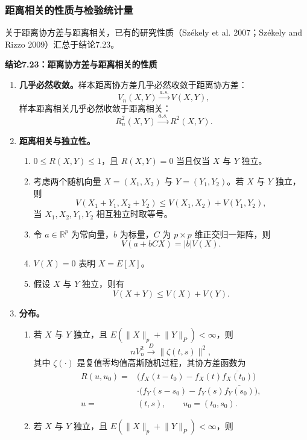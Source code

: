 \subsubsection{距离相关的性质与检验统计量}
关于距离协方差与距离相关，已有的研究性质（Székely et al. 2007；Székely and Rizzo 2009）汇总于结论7.23。

\par\medskip{}\noindent\textbf{结论7.23：距离协方差与距离相关的性质}\par
\begin{enumerate}
\item \textbf{几乎必然收敛。}样本距离协方差几乎必然收敛于距离协方差：
\[
V_n(X,Y)\xrightarrow{a.s.}V(X,Y),
\]
样本距离相关几乎必然收敛于距离相关：
\[
R_n^2(X,Y)\xrightarrow{a.s.}R^2(X,Y).
\]
\item \textbf{距离相关与独立性。}
\begin{enumerate}[label=\alph*.]
\item $0\le R(X,Y)\le1$，且 $R(X,Y)=0$ 当且仅当 $X$ 与 $Y$ 独立。
\item 考虑两个随机向量 $X=(X_1,X_2)$ 与 $Y=(Y_1,Y_2)$。若 $X$ 与 $Y$ 独立，则
\[
V(X_1+Y_1,X_2+Y_2)\le V(X_1,X_2)+V(Y_1,Y_2),
\]
当 $X_1,X_2,Y_1,Y_2$ 相互独立时取等号。
\item 令 $a\in\mathbb R^p$ 为常向量，$b$ 为标量，$C$ 为 $p\times p$ 维正交归一矩阵，则
\[
V(a+bCX)=|b|V(X).
\]
\item $V(X)=0$ 表明 $X=E[X]$。
\item 假设 $X$ 与 $Y$ 独立，则有
\[
V(X+Y)\le V(X)+V(Y).
\]
\end{enumerate}
\item \textbf{分布。}
\begin{enumerate}[label=\alph*.]
\item 若 $X$ 与 $Y$ 独立，且 $E(\lVert X\rVert_p+\lVert Y\rVert_P)<\infty$，则
\begin{equation}
nV_n^2\xrightarrow D\lVert\zeta(t,s)\rVert^2,
\tag{7.176}
\end{equation}
其中 $\zeta(\cdot)$ 是复值零均值高斯随机过程，其协方差函数为
\[
\begin{aligned}
R(u,u_0)={}&\bigl(f_X(t-t_0)-f_X(t)\overline{f_X(t_0)}\bigr)\\
&\cdot\bigl(f_Y(s-s_0)-f_Y(s)\overline{f_Y(s_0)}\bigr),\\
u={}&(t,s),\qquad u_0=(t_0,s_0).
\end{aligned}
\]
\item 若 $X$ 与 $Y$ 独立，且 $E(\lVert X\rVert_p+\lVert Y\rVert_P)<\infty$，则

\end{enumerate}
\end{enumerate}
